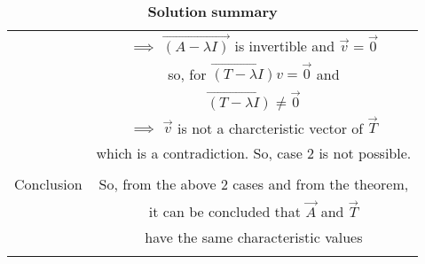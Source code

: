 \begin{longtable}{|c|c|}
& $\implies$ $\vec{(A-\lambda I)}$ is invertible and $\vec{v} = \vec{0}$\\
& so, for $\vec{(T-\lambda I)v} = \vec{0}$ and \\
& $\vec{(T-\lambda I)} \neq \vec{0}$\\
& $\implies$ $\vec{v}$ is not a charcteristic vector of $\vec{T}$\\
& which is a contradiction. So, case 2 is not possible.\\
& \\
\hline
Conclusion & So, from the above 2 cases and from the theorem,\\
&  it can be concluded that $\vec{A}$ and $\vec{T}$ \\
& have the same  characteristic values\\
\hline
\caption{$\textbf{Solution summary}$}
\label{eq:solutions/6/2/15/table:1}
\end{longtable}

\twocolumn


